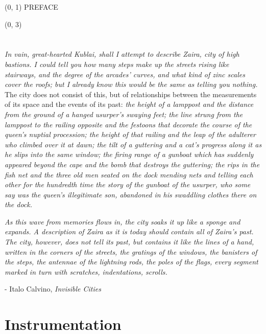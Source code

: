 \documentclass[10pt]{article}
\begin{document}
\scriptsize

\begin{textblock}{23} (0, 1)
\center\huge PREFACE
\end{textblock}

\begin{textblock}{23} (0, 3)

\section{}

\textit{In vain, great-hearted Kublai, shall I attempt to describe Zaira, city
of high bastions. I could tell you how many steps make up the streets rising
like stairways, and the degree of the arcades' curves, and what kind of zinc
scales cover the roofs; but I already know this would be the same as telling
you nothing.} The city does not consist of this, but of relationships between
the measurements of its space and the events of its past: \textit{the height of
a lamppost and the distance from the ground of a hanged usurper's swaying feet;
the line strung from the lamppost to the railing opposite and the festoons that
decorate the course of the queen's nuptial procession; the height of that
railing and the leap of the adulterer who climbed over it at dawn; the tilt of
a guttering and a cat's progress along it as he slips into the same window; the
firing range of a gunboat which has suddenly appeared beyond the cape and the
bomb that destroys the guttering; the rips in the fish net and the three old
men seated on the dock mending nets and telling each other for the hundredth
time the story of the gunboat of the usurper, who some say was the queen's
illegitimate son, abandoned in his swaddling clothes there on the dock.}

\textit{As this wave from memories flows in, the city soaks it up like a sponge
and expands. A description of Zaira as it is today should contain all of
Zaira's past. The city, however, does not tell its past, but contains it like
the lines of a hand, written in the corners of the streets, the gratings of the
windows, the banisters of the steps, the antennae of the lightning rods, the
poles of the flags, every segment marked in turn with scratches, indentations,
scrolls. }

- Italo Calvino, \emph{Invisible Cities}

\section{Instrumentation}


\end{textblock}
\end{document}

